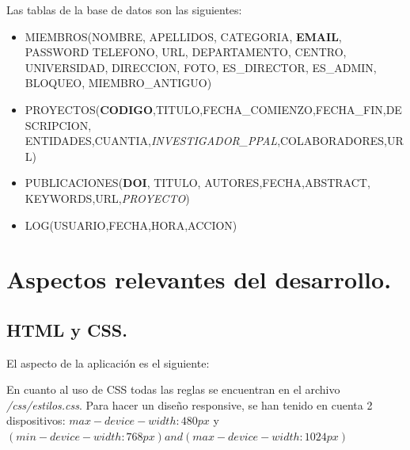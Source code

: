 \documentclass[a4paper, 11pt]{article} %
\begin{document}
	
\medskip
Las tablas de la base de datos son las siguientes:
\begin{itemize}
	\item MIEMBROS(NOMBRE, APELLIDOS, CATEGORIA, \textbf{EMAIL}, PASSWORD	TELEFONO, URL, DEPARTAMENTO, CENTRO, UNIVERSIDAD, DIRECCION, FOTO, ES\_DIRECTOR, ES\_ADMIN, BLOQUEO, MIEMBRO\_ANTIGUO) 
	\item PROYECTOS(\textbf{CODIGO},TITULO,FECHA\_COMIENZO,FECHA\_FIN,DESCRIPCION,
	ENTIDADES,CUANTIA,\textit{INVESTIGADOR\_PPAL},COLABORADORES,URL)
	\item PUBLICACIONES(\textbf{DOI}, TITULO, AUTORES,FECHA,ABSTRACT, KEYWORDS,URL,\textit{PROYECTO}) 
	\item LOG(USUARIO,FECHA,HORA,ACCION)
\end{itemize}
\section{Aspectos relevantes del desarrollo.}
\subsection{HTML y CSS.}
El aspecto de la aplicación es el siguiente:
\begin{figure}[H]
	
\end{figure}
En cuanto al uso de CSS todas las reglas se encuentran en el archivo \emph{/css/estilos.css}. Para hacer un diseño responsive, se han tenido en cuenta 2 dispositivos: $max-device-width: 480px$ y $(min-device-width: 768px) and (max-device-width: 1024px)$
\end{document}
